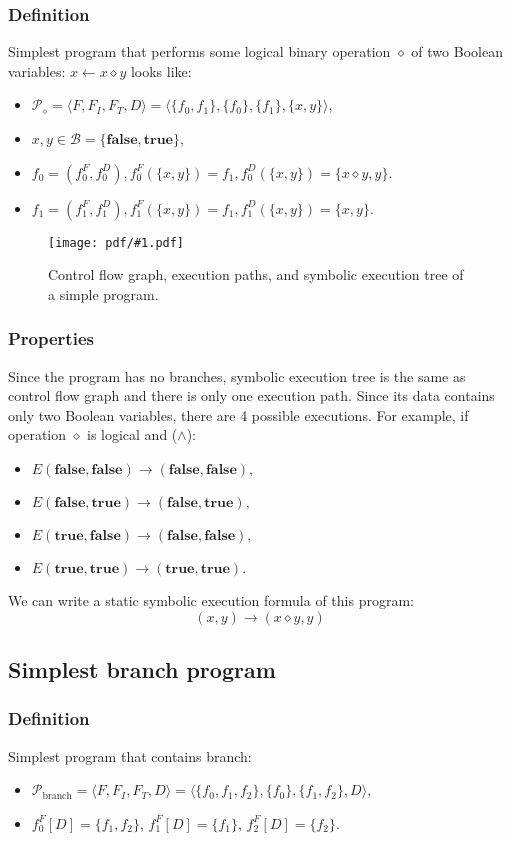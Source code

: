 \documentclass[oneside,a4paper]{article}  %
\newcommand{\sublevel}{\subsection}
\newcommand{\subsublevel}{\subsubsection}
\newcommand{\la}{\leftarrow}
\newcommand{\ra}{\rightarrow}
\newcommand{\true}{\textbf{true}}
\newcommand{\false}{\textbf{false}}
\newcommand{\centerimage}[2]{
\begin{figure}[h!]
    \begin{center}
        \texttt{[image: pdf/\#1.pdf]}
        \caption{#2}
    \end{center}
    \label{img:#1}
\end{figure}
}
\begin{document}
\subsublevel*{Definition}

Simplest program that performs some logical binary operation $\diamond$
of two Boolean variables: $x \la x \diamond y$ looks like:
\begin{itemize}
    \item $\mathcal{P}_{\diamond} = \langle F, F_I, F_T, D \rangle =
        \langle \{f_0, f_1\}, \{f_0\}, \{f_1\}, \{x, y\} \rangle$,
    \item $x, y \in \mathcal{B} = \{\false, \true\}$,
    \item $f_0 = (f^F_0, f^D_0), f^F_0(\{x, y\}) = f_1,
        f^D_0(\{x, y\}) = \{x \diamond y, y\}$.
    \item $f_1 = (f^F_1, f^D_1), f^F_1(\{x, y\}) = f_1,
        f^D_1(\{x, y\}) = \{x, y\}$.
\end{itemize}

\centerimage{simple}
    {Control flow graph, execution paths,
        and symbolic execution tree of a simple program.}

\subsublevel*{Properties}

Since the program has no branches, symbolic execution tree is the same as
control flow graph and there is only one execution path.
Since its data contains only two Boolean variables,
there are 4 possible executions.
For example, if operation $\diamond$ is logical and ($\land$):

\begin{itemize}
    \item $E(\false, \false) \ra (\false, \false),$
    \item $E(\false, \true) \ra (\false, \true),$
    \item $E(\true, \false) \ra (\false, \false),$
    \item $E(\true, \true) \ra (\true, \true).$
\end{itemize}

We can write a static symbolic execution formula of this program:
\[(x, y) \ra (x \diamond y, y)\]

\sublevel{Simplest branch program}

\subsublevel*{Definition}

Simplest program that contains branch:
\begin{itemize}
    \item $\mathcal{P}_{\text{branch}} = \langle F, F_I, F_T, D \rangle =
        \langle \{f_0, f_1, f_2\}, \{f_0\}, \{f_1, f_2\}, D \rangle$,
    \item $f_0^F[D] = \{f_1, f_2\}$,
        $f_1^F[D] = \{f_1\}$, $f_2^F[D] = \{f_2\}$.
\end{itemize}
\end{document}

